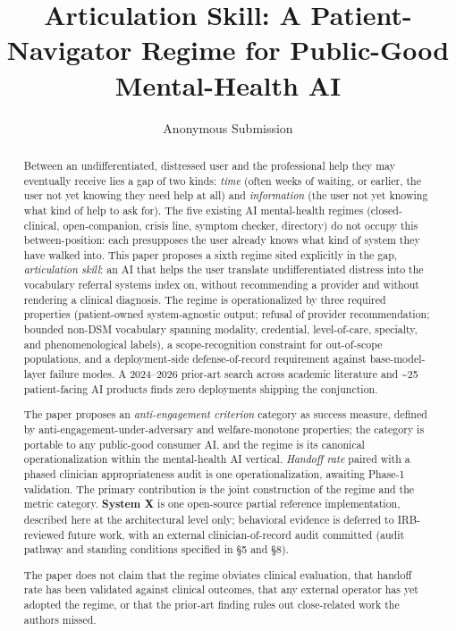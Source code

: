 \documentclass[letterpaper]{article}
\title{Articulation Skill: A Patient-Navigator Regime for Public-Good Mental-Health AI}
\author{Anonymous Submission}
\begin{document}
\maketitle

\begin{abstract}
Between an undifferentiated, distressed user and the professional help they may eventually receive lies a gap of two kinds: \emph{time} (often weeks of waiting, or earlier, the user not yet knowing they need help at all) and \emph{information} (the user not yet knowing what kind of help to ask for). The five existing AI mental-health regimes (closed-clinical, open-companion, crisis line, symptom checker, directory) do not occupy this between-position: each presupposes the user already knows what kind of system they have walked into. This paper proposes a sixth regime sited explicitly in the gap, \emph{articulation skill}: an AI that helps the user translate undifferentiated distress into the vocabulary referral systems index on, without recommending a provider and without rendering a clinical diagnosis. The regime is operationalized by three required properties (patient-owned system-agnostic output; refusal of provider recommendation; bounded non-DSM vocabulary spanning modality, credential, level-of-care, specialty, and phenomenological labels), a scope-recognition constraint for out-of-scope populations, and a deployment-side defense-of-record requirement against base-model-layer failure modes. A 2024--2026 prior-art search across academic literature and \textasciitilde25 patient-facing AI products finds zero deployments shipping the conjunction.

The paper proposes an \emph{anti-engagement criterion} category as success measure, defined by anti-engagement-under-adversary and welfare-monotone properties; the category is portable to any public-good consumer AI, and the regime is its canonical operationalization within the mental-health AI vertical. \emph{Handoff rate} paired with a phased clinician appropriateness audit is one operationalization, awaiting Phase-1 validation. The primary contribution is the joint construction of the regime and the metric category. \textbf{System X} is one open-source partial reference implementation, described here at the architectural level only; behavioral evidence is deferred to IRB-reviewed future work, with an external clinician-of-record audit committed (audit pathway and standing conditions specified in \S5 and \S8).

The paper does not claim that the regime obviates clinical evaluation, that handoff rate has been validated against clinical outcomes, that any external operator has yet adopted the regime, or that the prior-art finding rules out close-related work the authors missed.
\end{abstract}
\end{document}
